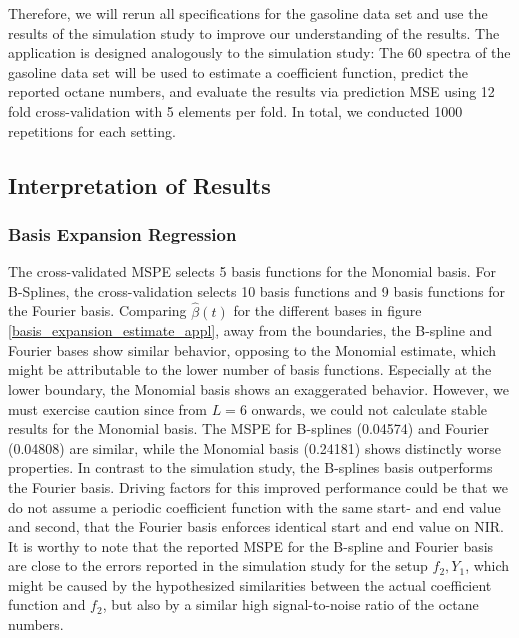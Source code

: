 \documentclass[11pt,twoside,a4paper]{article}
\begin{document}
		Therefore, we will rerun all specifications for the gasoline data set and use the results of the simulation study to improve our understanding of the results. The application is designed analogously to the simulation study: The 60 spectra of the gasoline data set will be used to estimate a coefficient function, predict the reported octane numbers, and evaluate the results via prediction MSE using 12 fold cross-validation with 5 elements per fold. In total, we conducted 1000 repetitions for each setting.
		

		
	\subsection{Interpretation of Results}
		\subsubsection{Basis Expansion Regression}
		The cross-validated MSPE selects 5 basis functions for the Monomial basis. For B-Splines, the cross-validation selects 10 basis functions and 9 basis functions for the Fourier basis. Comparing $\hat{\beta}(t)$ for the different bases in figure \ref{basis_expansion_estimate_appl}, away from the boundaries, the B-spline and Fourier bases show similar behavior, opposing to the Monomial estimate, which might be attributable to the lower number of basis functions. Especially at the lower boundary, the Monomial basis shows an exaggerated behavior. However, we must exercise caution since from $L=6$ onwards, we could not calculate stable results for the Monomial basis. The MSPE for B-splines (0.04574) and Fourier (0.04808) are similar, while the Monomial basis (0.24181) shows distinctly worse properties. 
		In contrast to the simulation study, the B-splines basis outperforms the Fourier basis. Driving factors for this improved performance could be that we do not assume a periodic coefficient function with the same start- and end value and second, that the Fourier basis enforces identical start and end value on NIR. It is worthy to note that the reported MSPE for the B-spline and Fourier basis are close to the errors reported in the simulation study for the setup $f_2,Y_1$, which might be caused by the hypothesized similarities between the actual coefficient function and $f_2$, but also by a similar high signal-to-noise ratio of the octane numbers. 
	
\end{document}
